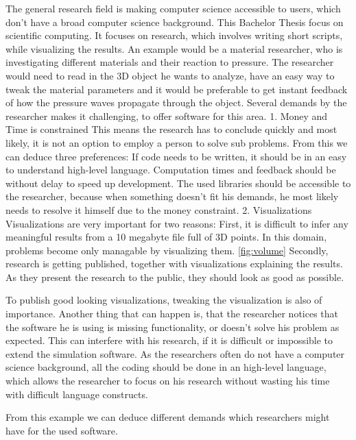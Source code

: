 The general research field is making computer science accessible to users, which don't have a broad computer science background. 
This Bachelor Thesis focus on scientific computing. It focuses on research, which involves writing short scripts, while visualizing the results. An example would be a material researcher, who is investigating different materials and their reaction to pressure.
The researcher would need to read in the 3D object he wants to analyze, have an easy way to tweak the material parameters and it would be preferable to get instant feedback of how the pressure waves propagate through the object. 
Several demands by the researcher makes it challenging, to offer software for this area.
1. Money and Time is constrained
This means the research has to conclude quickly and most likely, it is not an option to employ a person to solve sub problems.
From this we can deduce three preferences: If code needs to be written, it should be in an easy to understand high-level language. Computation times and feedback should be without delay to speed up development. The used libraries should be accessible to the researcher, because when something doesn't fit his demands, he most likely needs to resolve it himself due to the money constraint.
2. Visualizations
Visualizations are very important for two reasons:
First, it is difficult to infer any meaningful results from a 10 megabyte file full of 3D points. In this domain, problems become only managable by visualizing them. \ref{fig:volume}
Secondly, research is getting published, together with visualizations explaining the results. As they present the research to the public, they should look as good as possible.

To publish good looking visualizations, tweaking the visualization is also of importance. 
Another thing that can happen is, that the researcher notices that the software he is using is missing functionality, or doesn't solve his problem as expected. This can interfere with his research, if it is difficult or impossible to extend the simulation software. 
As the researchers often do not have a computer science background, all the coding should be done in an high-level language, which allows the researcher to focus on his research without wasting his time with difficult language constructs.

From this example we can deduce different demands which researchers might have for the used software.

